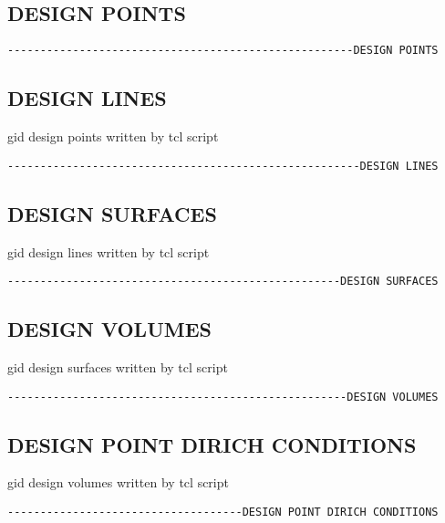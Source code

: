 \subsection{DESIGN POINTS}
\begin{verbatim}
-----------------------------------------------------DESIGN POINTS
\end{verbatim}



\subsection{DESIGN LINES}
gid design points written by tcl script
\begin{verbatim}
------------------------------------------------------DESIGN LINES
\end{verbatim}



\subsection{DESIGN SURFACES}
gid design lines written by tcl script
\begin{verbatim}
---------------------------------------------------DESIGN SURFACES
\end{verbatim}



\subsection{DESIGN VOLUMES}
gid design surfaces written by tcl script
\begin{verbatim}
----------------------------------------------------DESIGN VOLUMES
\end{verbatim}



\subsection{DESIGN POINT DIRICH CONDITIONS}
gid design volumes written by tcl script
\begin{verbatim}
------------------------------------DESIGN POINT DIRICH CONDITIONS 
\end{verbatim}




